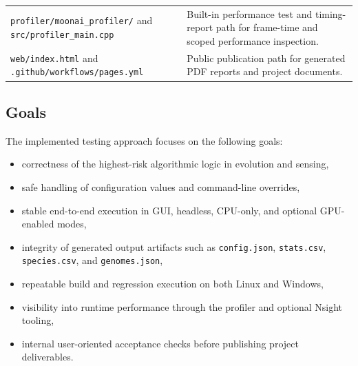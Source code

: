\begin{table}[H]
\begin{tabularx}{\textwidth}{@{}>{\ttfamily\small}lX@{}}
		\texttt{profiler/moonai\_profiler/} and \texttt{src/profiler\_main.cpp} & Built-in performance test and timing-report path for frame-time and scoped performance inspection.                                                \\
		\texttt{web/index.html} and \texttt{.github/workflows/pages.yml}        & Public publication path for generated PDF reports and project documents.                                                                          \\
		\bottomrule
	\end{tabularx}
\end{table}

\subsection{Goals}

The implemented testing approach focuses on the following goals:

\begin{itemize}[nosep]
	\item correctness of the highest-risk algorithmic logic in evolution and sensing,
	\item safe handling of configuration values and command-line overrides,
	\item stable end-to-end execution in GUI, headless, CPU-only, and optional GPU-enabled modes,
	\item integrity of generated output artifacts such as \texttt{config.json},
	      \texttt{stats.csv}, \texttt{species.csv}, and \texttt{genomes.json},
	\item repeatable build and regression execution on both Linux and Windows,
	\item visibility into runtime performance through the profiler and optional Nsight tooling,
	\item internal user-oriented acceptance checks before publishing project deliverables.
\end{itemize}
